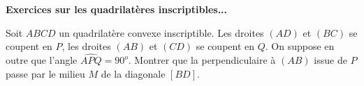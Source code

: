 \Large \textbf{Exercices sur les quadrilatères inscriptibles...}

\normalsize

\bigskip
\bigskip


\begin{exo}

\medskip

Soit $ABCD$ un quadrilatère convexe inscriptible. Les droites $(AD)$ et $(BC)$ se coupent en $P$, les droites $(AB)$ et $(CD)$ se coupent en $Q$. On suppose en outre que l'angle $\widehat{APQ} = 90^o$. Montrer que la perpendiculaire à $(AB)$ issue de $P$ passe par le milieu $M$ de la diagonale $[BD]$.

\end{exo}

\begin{center}


\end{center}
